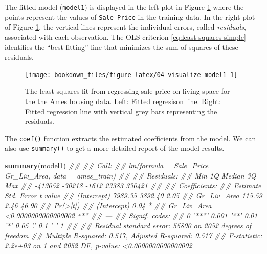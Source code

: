 \documentclass[]{krantz}
\makeatletter
\newenvironment{Shaded}{\begin{snugshade}}{\end{snugshade}}
\newcommand{\CommentTok}[1]{\textcolor[rgb]{0.37,0.37,0.37}{\textit{#1}}}
\newcommand{\KeywordTok}[1]{\textcolor[rgb]{0.27,0.27,0.27}{\textbf{#1}}}
\newcommand{\NormalTok}[1]{#1}
\newenvironment{kframe}{%
\medskip{}
\setlength{\fboxsep}{.8em}
 \def\at@end@of@kframe{}%
 \ifinner\ifhmode%
  \def\at@end@of@kframe{\end{minipage}}%
  \begin{minipage}{\columnwidth}%
 \fi\fi%
 \def\FrameCommand##1{\hskip\@totalleftmargin \hskip-\fboxsep
 \colorbox{shadecolor}{##1}\hskip-\fboxsep
     \hskip-\linewidth \hskip-\@totalleftmargin \hskip\columnwidth}%
 \MakeFramed {\advance\hsize-\width
   \@totalleftmargin\z@ \linewidth\hsize
   \@setminipage}}%
 {\par\unskip\endMakeFramed%
 \at@end@of@kframe}
\renewenvironment{Shaded}{\begin{kframe}}{\end{kframe}}
\makeatother
\begin{document}
The fitted model (\texttt{model1}) is displayed in the left plot in Figure \ref{fig:04-visualize-model1} where the points represent the values of \texttt{Sale\_Price} in the training data. In the right plot of Figure \ref{fig:04-visualize-model1}, the vertical lines represent the individual errors, called \emph{residuals}, associated with each observation. The OLS criterion \eqref{eq:least-squares-simple} identifies the ``best fitting'' line that minimizes the sum of squares of these residuals.

\begin{figure}

{\centering \texttt{[image: bookdown\_files/figure-latex/04-visualize-model1-1]} 

}

\caption{The least squares fit from regressing sale price on living space for the the Ames housing data. Left: Fitted regresison line. Right: Fitted regression line with vertical grey bars representing the residuals.}\label{fig:04-visualize-model1}
\end{figure}

The \texttt{coef()} function extracts the estimated coefficients from the model. We can also use \texttt{summary()} to get a more detailed report of the model results.

\begin{Shaded}
\begin{Highlighting}[]
\KeywordTok{summary}\NormalTok{(model1)}
\CommentTok{## }
\CommentTok{## Call:}
\CommentTok{## lm(formula = Sale_Price ~ Gr_Liv_Area, data = ames_train)}
\CommentTok{## }
\CommentTok{## Residuals:}
\CommentTok{##     Min      1Q  Median      3Q     Max }
\CommentTok{## -413052  -30218   -1612   23383  330421 }
\CommentTok{## }
\CommentTok{## Coefficients:}
\CommentTok{##             Estimate Std. Error t value}
\CommentTok{## (Intercept)  7989.35    3892.40    2.05}
\CommentTok{## Gr_Liv_Area   115.59       2.46   46.90}
\CommentTok{##                        Pr(>|t|)    }
\CommentTok{## (Intercept)                0.04 *  }
\CommentTok{## Gr_Liv_Area <0.0000000000000002 ***}
\CommentTok{## ---}
\CommentTok{## Signif. codes:  }
\CommentTok{## 0 '***' 0.001 '**' 0.01 '*' 0.05 '.' 0.1 ' ' 1}
\CommentTok{## }
\CommentTok{## Residual standard error: 55800 on 2052 degrees of freedom}
\CommentTok{## Multiple R-squared:  0.517,  Adjusted R-squared:  0.517 }
\CommentTok{## F-statistic: 2.2e+03 on 1 and 2052 DF,  p-value: <0.0000000000000002}
\end{Highlighting}
\end{Shaded}
\end{document}
